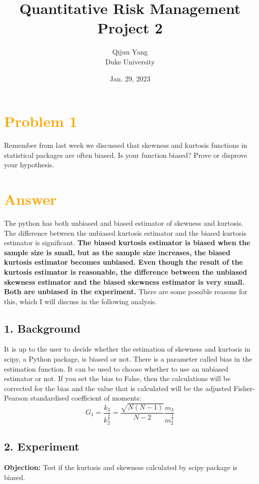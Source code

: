 \documentclass[11pt,en]{elegantpaper}
\title{Quantitative Risk Management Project 2}
\author{Qijun Yang \\ Duke University}
\institute{\href{https://fintech.meng.duke.edu}{Financial Technology of Duke}}
\date{Jan. 29, 2023}
\begin{document}
\maketitle

\section*{\textcolor{orange}{Problem 1}}
Remember from last week we discussed that skewness and kurtosis functions in statistical packages 
are often biased. Is your function biased? Prove or disprove your hypothesis.

\section*{\textcolor{orange}{Answer}}
The python has both unbiased and biased estimator of skewness and kurtosis. The difference between the unbiased kurtosis estimator and the biased kurtosis estimator 
is significant. \textbf{The biased kurtosis estimator is biased when the sample size is small, 
but as the sample size increases, the biased kurtosis estimator becomes unbiased. Even though the result of the kurtosis estimator is reasonable, the difference 
between the unbiased skewness estimator and the biased skewness estimator is very small. 
Both are unbiased in the experiment.} There are some possible reasons for this, 
which I will discuss in the following analysis.

\subsection*{1. Background}
It is up to the user to decide whether the estimation of skewness and kurtosis in scipy, a Python package, 
is biased or not. There is a parameter called bias in the estimation function. It can be used to choose 
whether to use an unbiased estimator or not. If you set the bias to False, then the calculations will be 
corrected for the bias and the value that is calculated will be the adjusted Fisher-Pearson standardised 
coefficient of moments:
\[
    G_1=\frac{k_3}{k_2^{\frac{3}{2}}}=\frac{\sqrt{N(N-1)}}{N-2}\frac{m_3}{m_2^{\frac{3}{2}}}
\]

\subsection*{2. Experiment}
\textbf{Objection:} Test if the kurtosis and skewness calculated by scipy package is biased.
\end{document}
